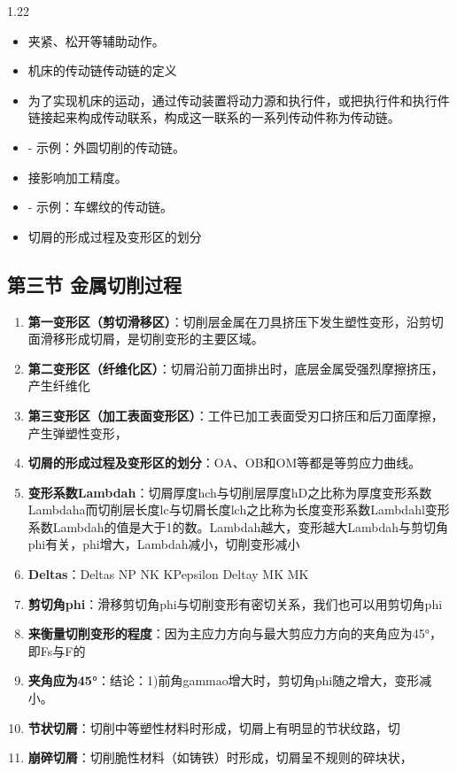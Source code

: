 \documentclass[12pt,a4paper]{article}
\begin{document}
\begin{spacing}{1.22}
\begin{itemize}[leftmargin=2.2em,label=--]
  \item 夹紧、松开等辅助动作。
  \item 机床的传动链传动链的定义
  \item 为了实现机床的运动，通过传动装置将动力源和执行件，或把执行件和执行件链接起来构成传动联系，构成这一联系的一系列传动件称为传动链。
  \item - 示例：外圆切削的传动链。
  \item 接影响加工精度。
  \item - 示例：车螺纹的传动链。
  \item 切屑的形成过程及变形区的划分
\end{itemize}

\subsection{第三节 金属切削过程}
\begin{tcolorbox}[colback=yellow!6,colframe=red!55!black,title=重点,left=1mm,right=1mm]
\begin{enumerate}[leftmargin=2.2em,label=\arabic*.]
  \item \textbf{第一变形区（剪切滑移区）}：切削层金属在刀具挤压下发生塑性变形，沿剪切面滑移形成切屑，是切削变形的主要区域。
  \item \textbf{第二变形区（纤维化区）}：切屑沿前刀面排出时，底层金属受强烈摩擦挤压，产生纤维化
  \item \textbf{第三变形区（加工表面变形区）}：工件已加工表面受刃口挤压和后刀面摩擦，产生弹塑性变形，
  \item \textbf{切屑的形成过程及变形区的划分}：OA、OB和OM等都是等剪应力曲线。
  \item \textbf{变形系数Lambdah}：切屑厚度hch与切削层厚度hD之比称为厚度变形系数Lambdaha而切削层长度lc与切屑长度lch之比称为长度变形系数Lambdahl变形系数Lambdah的值是大于1的数。Lambdah越大，变形越大Lambdah与剪切角phi有关，phi增大，Lambdah减小，切削变形减小
  \item \textbf{Deltas}：Deltas NP NK KPepsilon Deltay MK MK
  \item \textbf{剪切角phi}：滑移剪切角phi与切削变形有密切关系，我们也可以用剪切角phi
  \item \textbf{来衡量切削变形的程度}：因为主应力方向与最大剪应力方向的夹角应为45°，即Fs与F的
  \item \textbf{夹角应为45°}：结论：1)前角gammao增大时，剪切角phi随之增大，变形减小。
  \item \textbf{节状切屑}：切削中等塑性材料时形成，切屑上有明显的节状纹路，切
  \item \textbf{崩碎切屑}：切削脆性材料（如铸铁）时形成，切屑呈不规则的碎块状，

\end{enumerate}
\end{tcolorbox}
\end{spacing}
\end{document}
